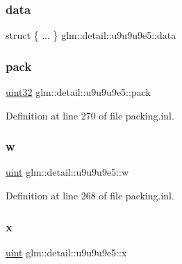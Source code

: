 \subsubsection{\texorpdfstring{data}{data}}
{\footnotesize\ttfamily struct \{ ... \}   glm\+::detail\+::u9u9u9e5\+::data}

\mbox{\label{unionglm_1_1detail_1_1u9u9u9e5_a76c0b28299b57da27b9e023091ae9c32}} 
\subsubsection{\texorpdfstring{pack}{pack}}
{\footnotesize\ttfamily \mbox{\hyperlink{namespaceglm_1_1detail_ade6cfbf377022aaa391af8cd50489222}{uint32}} glm\+::detail\+::u9u9u9e5\+::pack}



Definition at line 270 of file packing.\+inl.

\mbox{\label{unionglm_1_1detail_1_1u9u9u9e5_afadc52b82254e8969b5e83601309f668}} 
\subsubsection{\texorpdfstring{w}{w}}
{\footnotesize\ttfamily \mbox{\hyperlink{group__core__precision_ga4fd29415871152bfb5abd588334147c8}{uint}} glm\+::detail\+::u9u9u9e5\+::w}



Definition at line 268 of file packing.\+inl.

\mbox{\label{unionglm_1_1detail_1_1u9u9u9e5_a6cca809221a0d479ce9878bfca62ad49}} 
\subsubsection{\texorpdfstring{x}{x}}
{\footnotesize\ttfamily \mbox{\hyperlink{group__core__precision_ga4fd29415871152bfb5abd588334147c8}{uint}} glm\+::detail\+::u9u9u9e5\+::x}



